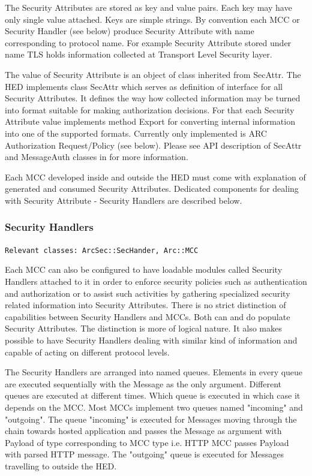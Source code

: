 \documentclass{book}
\begin{document}
The Security Attributes are stored as key and value pairs. Each key may have only single value attached. Keys are simple strings. By convention each MCC or Security Handler (see below) produce Security Attribute with name corresponding to protocol name. For example Security Attribute stored under name TLS holds information collected at Transport Level Security layer.

The value of Security Attribute is an object of class inherited from SecAttr. The HED implements class SecAttr which serves as definition of interface for all Security Attributes. It defines the way how collected information may be turned into format suitable for making authorization decisions. For that each Security Attribute value implements method Export for converting internal information into one of the supported formats. Currently only implemented is ARC Authorization Request/Policy (see below). Please see API description of SecAttr and MessageAuth classes in \cite{hed-api} for more information.

Each MCC developed inside and outside the HED must come with explanation of generated and consumed Security Attributes. Dedicated components for dealing with Security Attribute - Security Handlers are described below.


\subsubsection{Security Handlers}

\texttt{Relevant classes: ArcSec::SecHander, Arc::MCC}

Each MCC can also be configured to have loadable modules called Security Handlers attached to it in order to enforce security policies such as authentication and authorization or to assist such activities by gathering specialized security related information into Security Attributes. There is no strict distinction of capabilities between Security Handlers and MCCs. Both can and do populate Security Attributes. The distinction is more of logical nature. It also makes possible to have Security Handlers dealing with similar kind of information and capable of acting on different protocol levels.

The Security Handlers are arranged into named queues. Elements in every queue are executed sequentially with the Message as the only argument. Different queues are executed at  different times. Which queue is executed in which case it depends on the MCC. Most MCCs implement two queues named "incoming" and "outgoing". The queue "incoming" is executed for Messages moving through the chain towards hosted application and passes the Message as argument with Payload of type corresponding to MCC type i.e. HTTP MCC passes Payload with parsed HTTP message. The "outgoing" queue is executed for Messages travelling to outside the HED.
\end{document}
